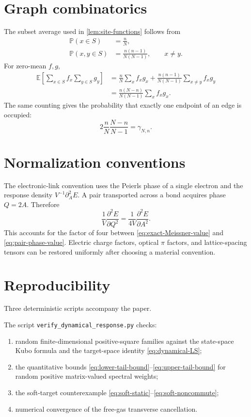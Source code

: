 \documentclass[11pt]{article}
\theoremstyle{definition}
\theoremstyle{remark}
\begin{document}
\section{Graph combinatorics}
\label{app:graph-combinatorics}

The subset average used in \cref{lem:site-functions} follows from
\begin{align}
 \mathbb P(x\in S)&=\frac nN,\\
 \mathbb P(x,y\in S)&=\frac{n(n-1)}{N(N-1)},\qquad x\ne y.
\end{align}
For zero-mean $f,g$,
\begin{align}
 \mathbb E\left[\sum_{x\in S}f_x\sum_{y\in S}g_y\right]
 &=\frac nN\sum_xf_xg_x
 +\frac{n(n-1)}{N(N-1)}\sum_{x\ne y}f_xg_y\\
 &=\frac{n(N-n)}{N(N-1)}\sum_xf_xg_x.
\end{align}
The same counting gives the probability that exactly one endpoint of an edge is occupied:
\begin{equation}
 2\frac nN\frac{N-n}{N-1}=\gamma_{N,n}.
\end{equation}

\section{Normalization conventions}
\label{app:normalization}

The electronic-link convention uses the Peierls phase of a single electron and the response density
$V^{-1}\partial_A^2E$.  A pair transported across a bond acquires phase $Q=2A$.  Therefore
\begin{equation}
 \frac1V\frac{\partial^2E}{\partial Q^2}
 =\frac1{4V}\frac{\partial^2E}{\partial A^2}.
\end{equation}
This accounts for the factor of four between \eqref{eq:exact-Meissner-value} and
\eqref{eq:pair-phase-value}.  Electric charge factors, optical $\pi$ factors, and lattice-spacing tensors can
be restored uniformly after choosing a material convention.

\section{Reproducibility}
\label{app:reproducibility}

Three deterministic scripts accompany the paper.

The script \texttt{verify\_dynamical\_response.py} checks:
\begin{enumerate}[leftmargin=1.6em]
\item random finite-dimensional positive-square families against the state-space Kubo formula and the
target-space identity \eqref{eq:dynamical-LS};
\item the quantitative bounds \eqref{eq:lower-tail-bound}--\eqref{eq:upper-tail-bound} for random
positive matrix-valued spectral weights;
\item the soft-target counterexample \eqref{eq:soft-static}--\eqref{eq:soft-noncommute};
\item numerical convergence of the free-gas transverse cancellation.
\end{enumerate}
\end{document}

